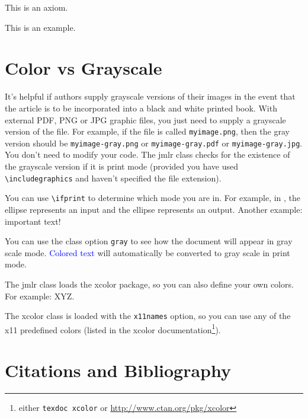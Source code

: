 \documentclass[pmlr,twocolumn,10pt]{jmlr} %
\begin{document}
\begin{axiom}\label{ax:sample}
This is an axiom.
\end{axiom}

\begin{example}[An Example]\label{ex:sample}
This is an example.
\end{example}

\section{Color vs Grayscale}
\label{sec:color}

It's helpful if authors supply grayscale versions of their
images in the event that the article is to be incorporated into
a black and white printed book. With external PDF, PNG or JPG
graphic files, you just need to supply a grayscale version of the
file. For example, if the file is called \texttt{myimage.png},
then the gray version should be \texttt{myimage-gray.png} or
\texttt{myimage-gray.pdf} or \texttt{myimage-gray.jpg}. You don't
need to modify your code. The \textsf{jmlr} class checks for
the existence of the grayscale version if it is print mode 
(provided you have used \verb|\includegraphics| and haven't
specified the file extension).

You can use \verb|\ifprint| to determine which mode you are in.
For example, in , the 
 ellipse represents an input and the
 ellipse represents an output.
Another example: {\ifprint{\bfseries}{\color{red}}important text!}

You can use the class option \texttt{gray} to see how the
document will appear in gray scale mode. \textcolor{blue}{Colored
text} will automatically be converted to gray scale in print mode.

The \textsf{jmlr} class loads the \textsf{xcolor}
package, so you can also define your own colors. For example:
\ifprint
  {}%
  {}%
\textcolor{myred}{XYZ}.

The \textsf{xcolor} class is loaded with the \texttt{x11names}
option, so you can use any of the x11 predefined colors (listed
in the \textsf{xcolor} documentation\footnote{either 
\texttt{texdoc xcolor} or \url{http://www.ctan.org/pkg/xcolor}}).

\section{Citations and Bibliography}
\label{sec:cite}
\end{document}
